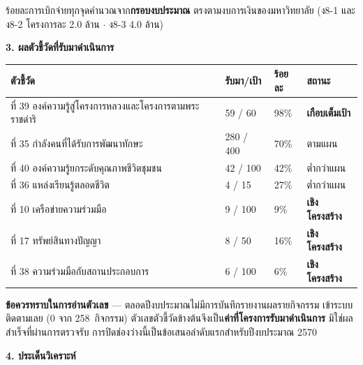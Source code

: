 \documentclass[11pt]{article}
\renewcommand{\arraystretch}{1.25}
\newcommand{\sechead}[1]{%
  \vspace{5pt}
  {\color{FirstBlue}\fontsize{13.5}{16}\selectfont\bfseries #1}%
  \par\vspace{-3pt}{\color{rpfgold}\rule{\linewidth}{1.2pt}}\par\vspace{2pt}}
\newenvironment{flagbox}[1]{%
  \colorlet{flagbar}{#1}%
  \par\vspace{3pt}\noindent
  \begin{lrbox}{\flagbuf}%
  \begin{minipage}{\dimexpr\linewidth-0.85cm\relax}\RaggedRight\small\vspace{3pt}}%
  {\vspace{3pt}\end{minipage}\end{lrbox}%
  \colorbox{flagbar!6}{\makebox[\dimexpr\linewidth-2\fboxsep\relax][l]{%
    \textcolor{flagbar}{\rule[-\dimexpr\dp\flagbuf+3pt\relax]{2.6pt}{\dimexpr\ht\flagbuf+\dp\flagbuf+6pt\relax}}%
    \hspace{5pt}\usebox{\flagbuf}}}\par\vspace{3pt}}
\begin{document}
\vspace{4pt}
{\footnotesize\color{black!60}ร้อยละการเบิกจ่ายทุกจุดคำนวณจาก\textbf{กรอบงบประมาณ} ตรงตามงบการเงินของมหาวิทยาลัย (ง8-1 และ ง8-2 โครงการละ 2.0 ล้าน $\cdot$ ง8-3 4.0 ล้าน)}

\sechead{3. ผลตัวชี้วัดที่รับมาดำเนินการ}

{\small\renewcommand{\arraystretch}{1.08}
\begin{tabular}{L{9.4cm}C{2.3cm}C{1.5cm}L{2.4cm}}
\toprule
{}
\textbf{ตัวชี้วัด} & \textbf{รับมา/เป้า} & \textbf{ร้อยละ} & \textbf{สถานะ}\\
\midrule
ที่ 39 องค์ความรู้สู่โครงการหลวงและโครงการตามพระราชดำริ & 59 / 60 & 98\% & {\color{tipgreen}\bfseries เกือบเต็มเป้า}\\
ที่ 35 กำลังคนที่ได้รับการพัฒนาทักษะ & 280 / 400 & 70\% & ตามแผน\\
ที่ 40 องค์ความรู้ยกระดับคุณภาพชีวิตชุมชน & 42 / 100 & 42\% & ต่ำกว่าแผน\\
ที่ 36 แหล่งเรียนรู้ตลอดชีวิต & 4 / 15 & 27\% & ต่ำกว่าแผน\\
ที่ 10 เครือข่ายความร่วมมือ & 9 / 100 & 9\% & {\color{warnred}\bfseries เชิงโครงสร้าง}\\
ที่ 17 ทรัพย์สินทางปัญญา & 8 / 50 & 16\% & {\color{warnred}\bfseries เชิงโครงสร้าง}\\
ที่ 38 ความร่วมมือกับสถานประกอบการ & 6 / 100 & 6\% & {\color{warnred}\bfseries เชิงโครงสร้าง}\\
\bottomrule
\end{tabular}}

\vspace{3pt}
\begin{flagbox}{SecondBlue}
\textbf{ข้อควรทราบในการอ่านตัวเลข} --- ตลอดปีงบประมาณไม่มีการบันทึกรายงานผลรายกิจกรรม
เข้าระบบติดตามเลย (0 จาก 258~กิจกรรม) ตัวเลขตัวชี้วัดข้างต้นจึงเป็น\textbf{ค่าที่โครงการรับมาดำเนินการ}
มิใช่ผลสำเร็จที่ผ่านการตรวจรับ การปิดช่องว่างนี้เป็นข้อเสนอลำดับแรกสำหรับปีงบประมาณ 2570
\end{flagbox}

\sechead{4. ประเด็นวิเคราะห์}
\end{document}
